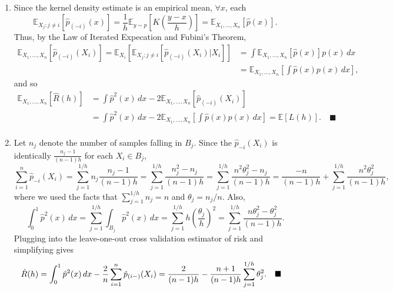\documentclass[11pt]{article}
\renewcommand{\qed}{\quad \ensuremath{\blacksquare}}
\newcommand{\E}{\mathbb{E}} %
\begin{document}
\begin{enumerate}
\newpage
\item Since the kernel density estimate is an empirical mean, $\forall x$, each
\[\E_{X_j : j \neq i} \left[ \hat p_{(-i)}(x) \right]
    = \frac{1}{h} \E_{y \sim p}\left[  K\left( \frac{y - x}{h} \right) \right]
    = \E_{X_1,\dots,X_n} \left[ \hat p(x) \right].\]
Thus, by the Law of Iterated Expecation and Fubini's Theorem,
\begin{align*}
\E_{X_1,\dots,X_n} \left[ \hat p_{(-i)}(X_i) \right]
    = \E_{X_i} \left[ \E_{X_j : j \neq i} \left[ \hat p_{(-i)}(X_i) | X_i \right] \right]
 &  = \int \E_{X_1,\dots,X_n} \left[ \hat p(x) \right] p(x) \, dx   \\
 &  = \E_{X_1,\dots,X_n} \left[ \int \hat p(x) p(x) \, dx \right],
\end{align*}
and so
\begin{align*}
\E_{X_1,\dots,X_n} \left[ \hat R(h) \right]
 &  = \int \hat p^2(x) \, dx - 2 \E_{X_1,\dots,X_n} \left[ \hat p_{(-i)}(X_i) \right]   \\
 &  = \int \hat p^2(x) \, dx - 2 \E_{X_1,\dots,X_n} \left[ \int \hat p(x) p(x) \, dx \right]
    = \E[L(h)]. \qed \\
\end{align*}

\item Let $n_j$ denote the number of samples falling in $B_j$. Since the
$\hat p_{-i}(X_i)$ is identically $\frac{n_j - 1}{(n - 1)h}$ for each
$X_i \in B_j$,
\[\sum_{i = 1}^n \hat p_{-i}(X_i)
    = \sum_{j = 1}^{1/h} n_j \frac{n_j - 1}{(n - 1)h}
    = \sum_{j = 1}^{1/h} \frac{n_j^2 - n_j}{(n - 1)h}
    = \sum_{j = 1}^{1/h} \frac{n^2\theta_j^2 - n_j}{(n - 1)h}
    = \frac{-n}{(n - 1)h} + \sum_{j = 1}^{1/h} \frac{n^2\theta_j^2}{(n - 1)h}
,\]
where we used the facts that $\sum_{j = 1}^{1/h} n_j = n$ and
$\theta_j = n_j/n$. Also,
\[\int_0^1 \hat p^2(x) \, dx
    = \sum_{j = 1}^{1/h} \int_{B_j} \hat p^2(x) \, dx
    = \sum_{j = 1}^{1/h} h \left( \frac{\theta_j}{h} \right)^2
    = \sum_{j = 1}^{1/h} \frac{n\theta_j^2 - \theta_j^2}{(n - 1)h}.\]
Plugging into the leave-one-out cross validation estimator of risk and
simplifying gives
\begin{align}
\notag
\hat R(h)
    = \int_0^1 \hat p^2(x) \, dx
        - \frac{2}{n} \sum_{i = 1}^n \hat p_{(i-)}(X_i)
 &  = \frac{2}{(n - 1)h}
    - \frac{n + 1}{(n - 1)h} \sum_{j = 1}^{1/h} \theta_j^2. \qed
\end{align}



\end{enumerate}
\end{document}
